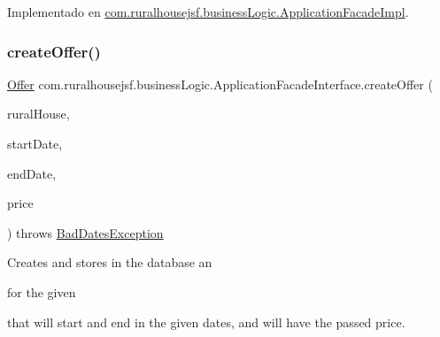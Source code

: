 Implementado en \mbox{\hyperlink{classcom_1_1ruralhousejsf_1_1business_logic_1_1_application_facade_impl_ae48e63f3df5226e46e4a57a64d120823}{com.\+ruralhousejsf.\+business\+Logic.\+Application\+Facade\+Impl}}.

\mbox{\label{interfacecom_1_1ruralhousejsf_1_1business_logic_1_1_application_facade_interface_a5a056a1b07c8ee83c1d540812b0a880d}} 
\subsubsection{\texorpdfstring{createOffer()}{createOffer()}\hspace{0.1cm}{\footnotesize\ttfamily [1/2]}}
{\footnotesize\ttfamily \mbox{\hyperlink{classcom_1_1ruralhousejsf_1_1domain_1_1_offer}{Offer}} com.\+ruralhousejsf.\+business\+Logic.\+Application\+Facade\+Interface.\+create\+Offer (\begin{DoxyParamCaption}\item[{\mbox{\hyperlink{classcom_1_1ruralhousejsf_1_1domain_1_1_rural_house}{Rural\+House}}}]{rural\+House,  }\item[{Local\+Date}]{start\+Date,  }\item[{Local\+Date}]{end\+Date,  }\item[{double}]{price }\end{DoxyParamCaption}) throws \mbox{\hyperlink{classcom_1_1ruralhousejsf_1_1exceptions_1_1_bad_dates_exception}{Bad\+Dates\+Exception}}}

Creates and stores in the database an
\begin{DoxyCode}{0}
\end{DoxyCode}
 for the given
\begin{DoxyCode}{0}
\end{DoxyCode}
 that will start and end in the given dates, and will have the passed price.



